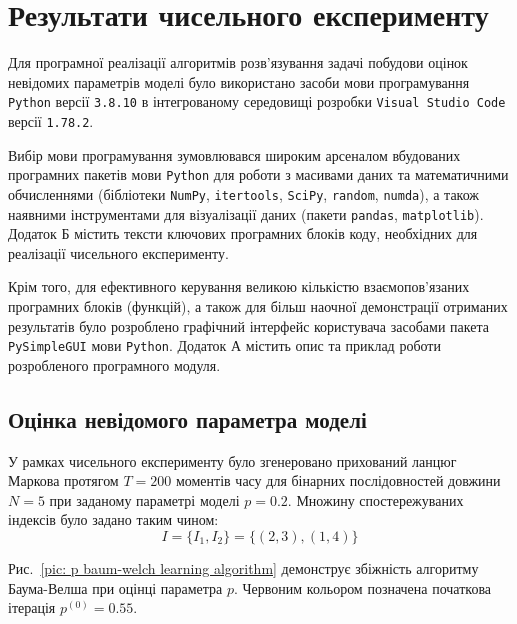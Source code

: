 \chapter{Результати чисельного експерименту}
\label{chap: practice}

Для програмної реалізації алгоритмів розв’язування задачі побудови оцінок невідомих параметрів моделі було використано засоби мови програмування \texttt{Python} версії \texttt{3.8.10} в інтегрованому середовищі розробки \texttt{Visual Studio Code} версії \texttt{1.78.2}.

Вибір мови програмування зумовлювався широким арсеналом вбудованих програмних пакетів мови \texttt{Python} для роботи з масивами даних та математичними обчисленнями (бібліотеки \texttt{NumPy}, \texttt{itertools}, \texttt{SciPy}, \texttt{random}, \texttt{numda}), а також наявними інструментами для візуалізації даних (пакети \texttt{pandas}, \texttt{matplotlib}). Додаток Б містить тексти ключових програмних блоків коду, необхідних для реалізації чисельного експерименту.

Крім того, для ефективного керування великою кількістю взаємопов'язаних програмних блоків (функцій), а також для більш наочної демонстрації отриманих результатів було розроблено графічний інтерфейс користувача засобами пакета \texttt{PySimpleGUI} мови \texttt{Python}. Додаток А містить опис та приклад роботи розробленого програмного модуля.

\section{Оцінка невідомого параметра моделі}

У рамках чисельного експерименту було згенеровано прихований ланцюг Маркова протягом $T=200$ моментів часу для бінарних послідовностей довжини $N=5$ при заданому параметрі моделі $p=0.2$. Множину спостережуваних індексів було задано таким чином:
\begin{equation}\label{eq: example observed indexes}
    I=\{I_1,I_2\}=\{(2,3),(1,4)\}
\end{equation} 

Рис.~\ref{pic: p baum-welch learning algorithm} демонструє збіжність алгоритму Баума-Велша при оцінці параметра $p$. Червоним кольором позначена початкова ітерація $p^{(0)}=0.55$.


